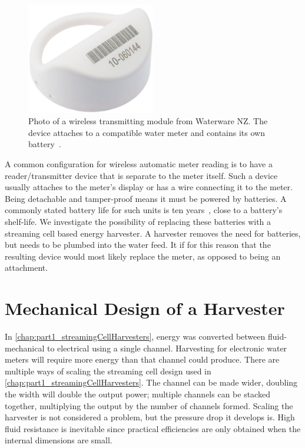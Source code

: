   \begin{figure}
    \centering
    \label{fig:Photo_waterwareMeter}
    \includegraphics[width=0.5\textwidth]{content/pt1/02-WirelessWaterMeter/graphics/hydro-WMBUSWLESSM}
    \caption[Photo of a wireless transmitting module from Waterware NZ.]{
      Photo of a wireless transmitting module from Waterware NZ.
      The device attaches to a compatible water meter and contains its own battery~\cite{BMeters2014}.
    }
  \end{figure}
  A common configuration for wireless automatic meter reading is to have a reader/transmitter device that is separate to the meter itself.
  Such a device usually attaches to the meter's display or has a wire connecting it to the meter.
  Being detachable and tamper-proof means it must be powered by batteries.
  A commonly stated battery life for such units is ten years~\cite{BMeters2014}, close to a battery's shelf-life.
  We investigate the possibility of replacing these batteries with a streaming cell based energy harvester.
  A harvester removes the need for batteries, but needs to be plumbed into the water feed.
  It if for this reason that the resulting device would most likely replace the meter, as opposed to being an attachment.


  \section{Mechanical Design of a Harvester}

    In \cref{chap:part1_streamingCellHarvesters}, energy was converted between fluid-mechanical to electrical using a single channel.
    Harvesting for electronic water meters will require more energy than that channel could produce.
    There are multiple ways of scaling the streaming cell design used in \cref{chap:part1_streamingCellHarvesters}.
    The channel can be made wider, doubling the width will double the output power;
    multiple channels can be stacked together, multiplying the output by the number of channels formed.
    Scaling the harvester is not considered a problem, but the pressure drop it develops is.
    High fluid resistance is inevitable since practical efficiencies are only obtained when the internal dimensions are small.

